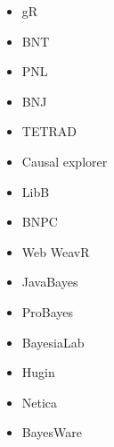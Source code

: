 \begin{multicols}{2}
\begin{itemize}
\item gR  \cite{gR}%

\item BNT  \cite{BNT04}%
\item PNL  \cite{PNL}%
\item BNJ  \cite{BNJ}%

\item TETRAD  \cite{TETRAD}%
\item Causal explorer \cite{Tsa05}%
\item LibB  \cite{LibB}%
\item BNPC  \cite{BNPC}%
\item Web WeavR  \cite{WEBWEAVER}%
\item JavaBayes  \cite{JAVABAYES}%

\item ProBayes  \cite{PROBAYES}%
\item BayesiaLab  \cite{BAYESIA}%
\item Hugin  \cite{HUGIN}%
\item Netica  \cite{NETICA}%
\item BayesWare  \cite{BAYESWARE}%


\end{itemize}
\end{multicols}
